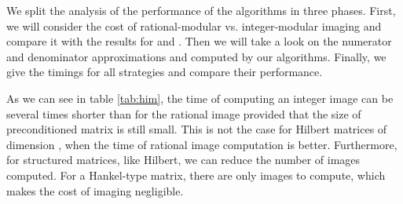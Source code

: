\documentclass{acm_proc_article-sp}   \usepackage{graphicx,url}
\begin{document}
We split the analysis of the performance of the algorithms in three phases. First, we will consider the cost of rational-modular vs. integer-modular imaging and compare it with the results for  and . Then we will take a look on the numerator and denominator approximations  and  computed by our algorithms. Finally, we give the timings for all strategies and compare their performance.

As we can see in table \ref{tab:him}, the time of computing an integer image can be several times shorter than for the rational image provided that the size of preconditioned matrix is still small. This is not the case for Hilbert matrices of dimension  , when the time of rational image computation is better. Furthermore, for structured matrices, like Hilbert, we can reduce  the number of images computed. For a Hankel-type matrix, there are only  images to compute, which makes the cost of imaging negligible.
\end{document}
